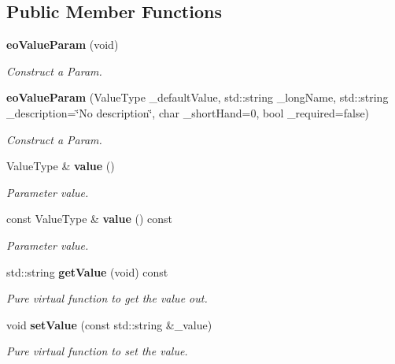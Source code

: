 \subsection*{Public Member Functions}
\begin{CompactItemize}
\item 
{\bf eo\-Value\-Param} (void)\label{classeo_value_param_a0}

\begin{CompactList}\small\item\em Construct a Param. \item\end{CompactList}\item 
{\bf eo\-Value\-Param} (Value\-Type \_\-default\-Value, std::string \_\-long\-Name, std::string \_\-description=\char`\"{}No description\char`\"{}, char \_\-short\-Hand=0, bool \_\-required=false)
\begin{CompactList}\small\item\em Construct a Param. \item\end{CompactList}\item 
Value\-Type \& {\bf value} ()
\begin{CompactList}\small\item\em Parameter value. \item\end{CompactList}\item 
const Value\-Type \& {\bf value} () const 
\begin{CompactList}\small\item\em Parameter value. \item\end{CompactList}\item 
std::string {\bf get\-Value} (void) const \label{classeo_value_param_a4}

\begin{CompactList}\small\item\em Pure virtual function to get the value out. \item\end{CompactList}\item 
void {\bf set\-Value} (const std::string \&\_\-value)\label{classeo_value_param_a5}

\begin{CompactList}\small\item\em Pure virtual function to set the value. \item\end{CompactList}\end{CompactItemize}
